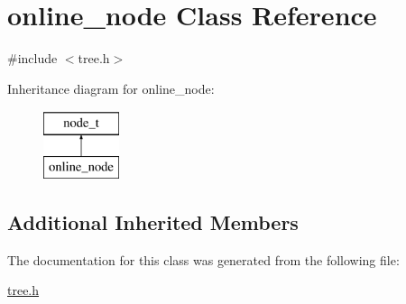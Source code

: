 \hypertarget{classonline__node}{\section{online\+\_\+node Class Reference}
\label{classonline__node}
}


{\ttfamily \#include $<$tree.\+h$>$}

Inheritance diagram for online\+\_\+node\+:\begin{figure}[H]
\begin{center}
\leavevmode
\includegraphics[height=2.000000cm]{classonline__node}
\end{center}
\end{figure}
\subsection*{Additional Inherited Members}


The documentation for this class was generated from the following file\+:\begin{DoxyCompactItemize}
\item 
\hyperlink{tree_8h}{tree.\+h}\end{DoxyCompactItemize}

